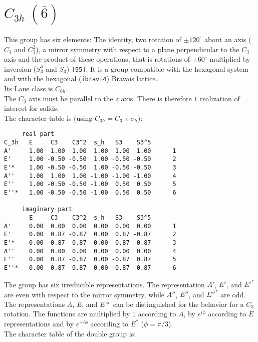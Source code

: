 \documentclass[12pt,a4paper,twoside]{report}
\begin{document}
\newpage
{\color{coral}\section{$C_{3h}\ (\bar 6)$}}  
\color{black}
This group has six elements: The identity, two rotation of $\pm120^\circ$ 
about an axis ($C_3$ and $C_3^2$), a mirror symmetry with respect to a 
plane perpendicular to the $C_3$ axis and the product of these operations, 
that is rotations of $\pm60^\circ$ multiplied by inversion 
($S_3^5$ and $S_3$) \texttt{[95]}.
It is a group compatible with the hexagonal system and with the  
hexagonal (\texttt{ibrav=4}) Bravais lattice. \\ 
Its Laue class is $C_{6h}$. \\
The $C_3$ axis must be parallel to the $z$ axis. There is therefore
$1$ realization of interest for solids. \\
The character table is (using $C_{3h}=C_3 \times \sigma_h$):

\begin{tcolorbox}
\begin{footnotesize}
\begin{verbatim}
     real part
C_3h   E     C3    C3^2  s_h   S3    S3^5 
A'     1.00  1.00  1.00  1.00  1.00  1.00      1
E'     1.00 -0.50 -0.50  1.00 -0.50 -0.50      2
E'*    1.00 -0.50 -0.50  1.00 -0.50 -0.50      3
A''    1.00  1.00  1.00 -1.00 -1.00 -1.00      4
E''    1.00 -0.50 -0.50 -1.00  0.50  0.50      5
E''*   1.00 -0.50 -0.50 -1.00  0.50  0.50      6

     imaginary part
       E     C3    C3^2  s_h   S3    S3^5 
A'     0.00  0.00  0.00  0.00  0.00  0.00      1
E'     0.00  0.87 -0.87  0.00  0.87 -0.87      2
E'*    0.00 -0.87  0.87  0.00 -0.87  0.87      3
A''    0.00  0.00  0.00  0.00  0.00  0.00      4
E''    0.00  0.87 -0.87  0.00 -0.87  0.87      5
E''*   0.00 -0.87  0.87  0.00  0.87 -0.87      6
\end{verbatim}
\end{footnotesize}
\end{tcolorbox}

The group has six irreducible representations. The representation 
$A'$, $E'$, and $E'^*$ are even with respect to the mirror symmetry, while
$A''$, $E''$, and $E''^*$ are odd. The representations $A$, $E$, and $E*$
can be distinguished for the behavior for a $C_3$ rotation. 
The functions are multiplied by $1$ according to $A$, by $e^{i\phi}$ according to 
$E$ representations and by $e^{-i\phi}$ according to $E^*$ ($\phi=\pi /3$). \\
The character table of the double group is:
\end{document}
